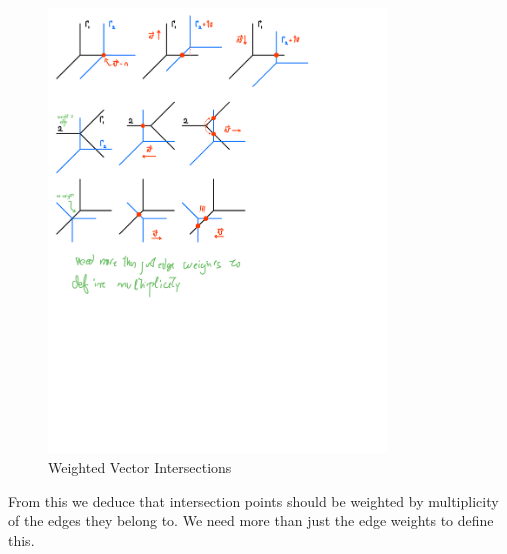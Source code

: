 \documentclass[12pt]{memoir}
\theoremstyle{definition}
\begin{document}
\begin{figure}[h!]
    \centering
    \includegraphics[width=0.8\textwidth, trim= 0.1cm 17.75cm 9cm 5.5cm,clip]{figs/fig11-3-4-and-5-VectorIntersections.pdf}
    \caption{Weighted Vector Intersections}
    \label{fig:11.4-WeightedVectorIntersection2}
\end{figure}
   
From this we deduce that intersection points should be weighted by multiplicity of the edges they belong to. We need more than just the edge weights to define this.
\end{document}
